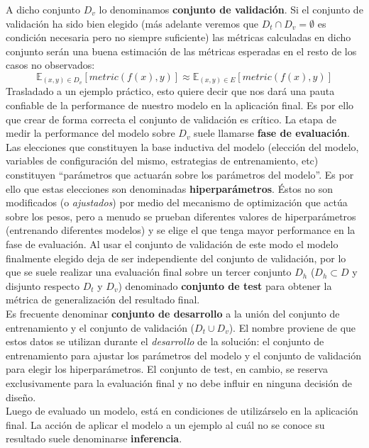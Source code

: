 A dicho conjunto $D_v$ lo denominamos \textbf{conjunto de validación}. 
Si el conjunto de validación ha sido bien elegido (más adelante veremos que $D_t \cap D_v = \emptyset$ es condición necesaria pero no siempre suficiente) las métricas calculadas en dicho conjunto serán una buena estimación de las métricas esperadas en el resto de los casos no observados:
\begin{equation*}
    \mathbb{E}_{(x,y) \in D_v} [metric(f(x),y)]  \approx \mathbb{E}_{(x,y) \in E} [metric(f(x),y)]
\end{equation*}
Trasladado a un ejemplo práctico, esto quiere decir que nos dará una pauta confiable de la performance de nuestro modelo en la aplicación final. Es por ello que crear de forma correcta el conjunto de validación es crítico. La etapa de medir la performance del modelo sobre $D_v$ suele llamarse \textbf{fase de evaluación}.\\

Las elecciones que constituyen la base inductiva del modelo (elección del modelo, variables de configuración del mismo, estrategias de entrenamiento, etc) constituyen ``parámetros que actuarán sobre los parámetros del modelo''. Es por ello que estas elecciones son denominadas \textbf{hiperparámetros}. Éstos no son modificados (o \textit{ajustados}) por medio del mecanismo de optimización que actúa sobre los pesos, pero a menudo se prueban diferentes valores de hiperparámetros (entrenando diferentes modelos) y se elige el que tenga mayor performance en la fase de evaluación. Al usar el conjunto de validación de este modo el modelo finalmente elegido deja de ser independiente del conjunto de validación, por lo que se suele realizar una evaluación final sobre un tercer conjunto $D_h$ ($D_h \subset D$ y disjunto respecto $D_t$ y $D_v$) denominado \textbf{conjunto de test} para obtener la métrica de generalización del resultado final. \\

Es frecuente denominar \textbf{conjunto de desarrollo} a la unión del conjunto de entrenamiento y el conjunto de validación ($D_t \cup D_v$). El nombre proviene de que estos datos se utilizan durante el \textit{desarrollo} de la solución: el conjunto de entrenamiento para ajustar los parámetros del modelo y el conjunto de validación para elegir los hiperparámetros. El conjunto de test, en cambio, se reserva exclusivamente para la evaluación final y no debe influir en ninguna decisión de diseño.\\

Luego de evaluado un modelo, está en condiciones de utilizárselo en la aplicación final. La acción de aplicar el modelo a un ejemplo al cuál no se conoce su resultado suele denominarse \textbf{inferencia}.

